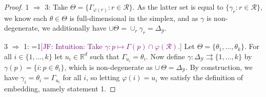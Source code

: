 \documentclass[12pt]{article}
\newcommand{\Comments}{1}
\newcommand{\mynote}[2]{\ifnum\Comments=1\textcolor{#1}{#2}\fi}
\newcommand{\mytodo}[2]{\ifnum\Comments=1%
  \todo[linecolor=#1!80!black,backgroundcolor=#1,bordercolor=#1!80!black]{#2}\fi}
\newcommand{\jessie}[1]{\mynote{purple}{[JF: #1]}}
\newcommand{\jessiet}[1]{\mytodo{purple!20!white}{JF: #1}}
\newcommand{\reals}{\mathbb{R}}
\newcommand{\simplex}{\Delta_\Y}
\newcommand{\R}{\mathcal{R}}
\newcommand{\Y}{\mathcal{Y}}
\newcommand{\risk}[1]{\underline{#1}}
\newcommand{\toto}{\rightrightarrows}
\newcommand{\trim}{\mathrm{trim}}
\begin{document}
\begin{proof}
	1 $\Rightarrow$ 3: 
	Take $\Theta = \{\Gamma_{\varphi(r)} : r \in \R\}$.
	As the latter set is equal to $\{\gamma_r : r \in \R\}$, we know each $\theta \in \Theta$ is full-dimensional in the simplex, and as $\gamma$ is non-degenerate, we additionally have $\cup \Theta = \cup_r \gamma_r = \simplex$.

%		


	3 $\Rightarrow$ 1: \jessie{Intuition: Take $\gamma : p \mapsto \Gamma(p) \cap \varphi(\R)$.}
    Let $\Theta = \{\theta_1,\ldots,\theta_k\}$.
	For all $i\in\{1,\ldots,k\}$ let $u_i\in\reals^d$ such that $\Gamma_{u_i} = \theta_i$.
	Now define $\gamma:\simplex\toto\{1,\ldots,k\}$ by $\gamma(p) = \{i : p\in\theta_i\}$, which is non-degenerate as $\cup\,\Theta = \simplex$.
	By construction, we have $\gamma_i = \theta_i = \Gamma_{u_i}$ for all $i$, so letting $\varphi(i) = u_i$ we satisfy the definition of embedding, namely statement 1.
	
\end{proof}
\end{document}
